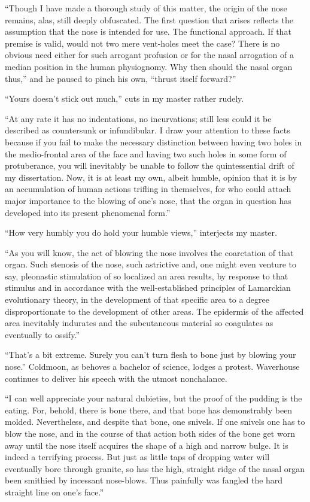 \documentclass{book}
\begin{document}
``Though I have made a thorough study of this matter, the origin of the
nose remains, alas, still deeply obfuscated. The first question that
arises reflects the assumption that the nose is intended for use. The
functional approach. If that premise is valid, would not two mere
vent-holes meet the case? There is no obvious need either for such
arrogant profusion or for the nasal arrogation of a median position in
the human physiognomy. Why then should the nasal organ thus,'' and he
paused to pinch his own, ``thrust itself forward?''

``Yours doesn't stick out much,'' cuts in my master rather rudely.

``At any rate it has no indentations, no incurvations; still less could
it be described as countersunk or infundibular. I draw your attention to
these facts because if you fail to make the necessary distinction
between having two holes in the medio-frontal area of the face and
having two such holes in some form of protuberance, you will inevitably
be unable to follow the quintessential drift of my dissertation. Now, it
is at least my own, albeit humble, opinion that it is by an accumulation
of human actions trifling in themselves, for who could attach major
importance to the blowing of one's nose, that the organ in question has
developed into its present phenomenal form.''

``How very humbly you do hold your humble views,'' interjects my master.

``As you will know, the act of blowing the nose involves the coarctation
of that organ. Such stenosis of the nose, such astrictive and, one might
even venture to say, pleonastic stimulation of so localized an area
results, by response to that stimulus and in accordance with the
well-established principles of Lamarckian evolutionary theory, in the
development of that specific area to a degree disproportionate to the
development of other areas. The epidermis of the affected area
inevitably indurates and the subcutaneous material so coagulates as
eventually to ossify.''

``That's a bit extreme. Surely you can't turn flesh to bone just by
blowing your nose.'' Coldmoon, as behoves a bachelor of science, lodges
a protest. Waverhouse continues to deliver his speech with the utmost
nonchalance.

``I can well appreciate your natural dubieties, but the proof of the
pudding is the eating. For, behold, there is bone there, and that bone
has demonstrably been molded. Nevertheless, and despite that bone, one
snivels. If one snivels one has to blow the nose, and in the course of
that action both sides of the bone get worn away until the nose itself
acquires the shape of a high and narrow bulge. It is indeed a terrifying
process. But just as little taps of dropping water will eventually bore
through granite, so has the high, straight ridge of the nasal organ been
smithied by incessant nose-blows. Thus painfully was fangled the hard
straight line on one's face.''
\end{document}
